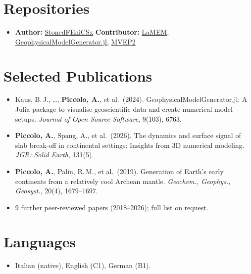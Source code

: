 \documentclass[11pt,a4paper,sans]{moderncv}
\begin{document}

\section{Repositories}
\vspace{1pt}
\begin{itemize}
\item \textbf{Author:} \href{https://github.com/APiccolo89/StonedFenicsx}{StonedFEniCSx} \textbar{} \textbf{Contributor:} \href{https://github.com/UniMainzGeo/LaMEM}{LaMEM}, \href{https://github.com/JuliaGeodynamics/GeophysicalModelGenerator.jl}{GeophysicalModelGenerator.jl}, \href{https://bitbucket.org/bkaus/mvep2/}{MVEP2}
\end{itemize}

\section{Selected Publications}
\vspace{1pt}
{\small
\begin{itemize}
\item Kaus, B.\,J., \ldots, \textbf{Piccolo, A.}, et al.\ (2024). GeophysicalModelGenerator.jl: A Julia package to visualise geoscientific data and create numerical model setups. \textit{Journal of Open Source Software}, 9(103), 6763.
\item \textbf{Piccolo, A.}, Spang, A., et al.\ (2026). The dynamics and surface signal of slab break-off in continental settings: Insights from 3D numerical modeling. \textit{JGR: Solid Earth}, 131(5).
\item \textbf{Piccolo, A.}, Palin, R.\,M., et al.\ (2019). Generation of Earth's early continents from a relatively cool Archean mantle. \textit{Geochem., Geophys., Geosyst.}, 20(4), 1679--1697.
\item[] 9 further peer-reviewed papers (2018--2026); full list on request.
\end{itemize}}


\section{Languages}
\vspace{1pt}
\begin{itemize}
\item Italian (native), English (C1), German (B1).
\end{itemize}
\end{document}
